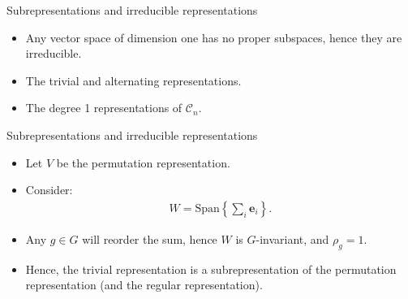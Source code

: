 \documentclass[10pt]{beamer}
\newcommand{\Cyc}{\mathcal{C}}
\newcommand{\bas}{\mathbf{e}}
\newcommand{\Span}{\text{Span}}
\begin{document}
	\begin{frame}{Subrepresentations and irreducible representations}

		
		\begin{example}
			\begin{itemize}
				\item Any vector space of dimension one has no proper subspaces, hence they are irreducible.
				
				\item The trivial and alternating representations.
				
				\item The degree 1 representations of $\Cyc_n$.
			\end{itemize}
		\end{example}
	\end{frame}
	\begin{frame}{Subrepresentations and irreducible representations}
		\begin{example}
			\begin{itemize}
				\item Let $V$ be the permutation representation. 
				
				\item Consider:
				\begin{align*}
					W = \Span\left\lbrace \sum_i \bas_i \right\rbrace.
				\end{align*}\pause
				
				\item Any $g \in G$ will reorder the sum, hence $W$ is $G$-invariant, and $\rho_g = 1$.\pause
				
				\item Hence, the trivial representation is a subrepresentation of the permutation representation (and the regular representation).
			\end{itemize}		
		\end{example}
	\end{frame}
\end{document}
